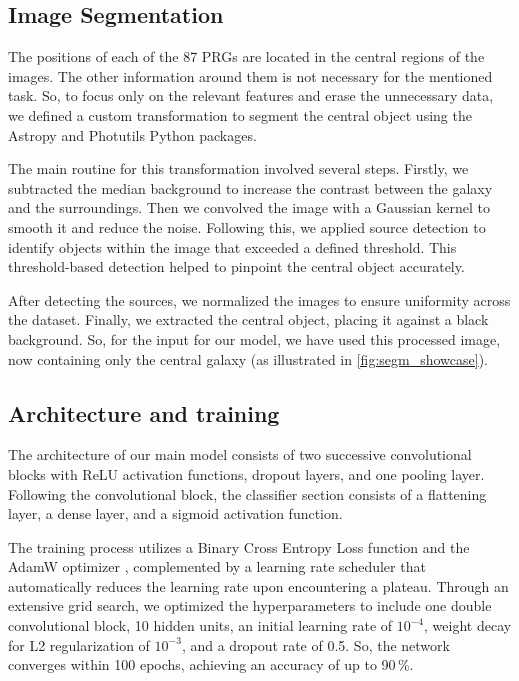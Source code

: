 \documentclass{aa}
\begin{document}
\subsection{Image Segmentation} 

The positions of each of the 87 PRGs are located in the central regions of the images. The other information around them is not necessary for the mentioned task. So, to focus only on the relevant features and erase the unnecessary data, we defined a custom transformation to segment the central object using the Astropy \citep{Price2018} and Photutils \citep{Bradley2024} Python packages.

The main routine for this transformation involved several steps. Firstly, we subtracted the median background to increase the contrast between the galaxy and the surroundings. Then we convolved the image with a Gaussian kernel to smooth it and reduce the noise. Following this, we applied source detection to identify objects within the image that exceeded a defined threshold. This threshold-based detection helped to pinpoint the central object accurately.

After detecting the sources, we normalized the images to ensure uniformity across the dataset. Finally, we extracted the central object, placing it against a black background. So, for the input for our model, we have used this processed image, now containing only the central galaxy (as illustrated in \autoref{fig:segm_showcase}).

\subsection{Architecture and training} 

The architecture of our main model consists of two successive convolutional blocks with ReLU activation functions, dropout layers, and one pooling layer. Following the convolutional block, the classifier section consists of a flattening layer, a dense layer, and a sigmoid activation function.

The training process utilizes a Binary Cross Entropy Loss function and the AdamW optimizer \citep{Loshchilov2019}, complemented by a learning rate scheduler that automatically reduces the learning rate upon encountering a plateau. Through an extensive grid search, we optimized the hyperparameters to include one double convolutional block, 10 hidden units, an initial learning rate of $10^{-4}$, weight decay for L2 regularization of $10^{-3}$, and a dropout rate of 0.5. So, the network converges within 100 epochs, achieving an accuracy of up to 90\,\%.
\end{document}
